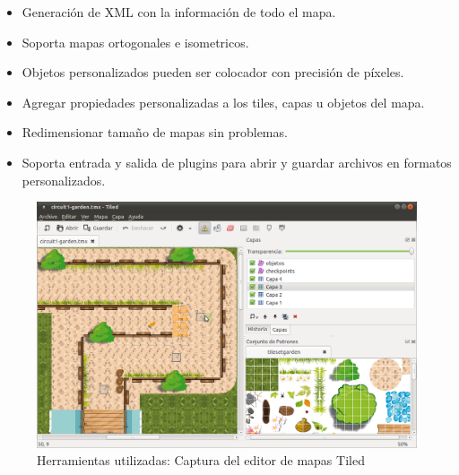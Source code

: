 \begin{itemize}
    \item Generación de XML con la información de todo el mapa.
    
    \item Soporta mapas ortogonales e isometricos.
    
    \item Objetos personalizados pueden ser colocador con precisión de píxeles.
    
    \item Agregar propiedades personalizadas a los tiles, capas u objetos del mapa.
    
    \item Redimensionar tamaño de mapas sin problemas.
    
    \item Soporta entrada y salida de plugins para abrir y guardar archivos en formatos personalizados.
\end{itemize}

\begin{figure}[H]
  \label{captura_tiled}
  \begin{center}
    \includegraphics[scale=0.4]{imagenes/captura_tiled.png}
  \end{center}
  \caption{Herramientas utilizadas: Captura del editor de mapas Tiled}
\end{figure}



